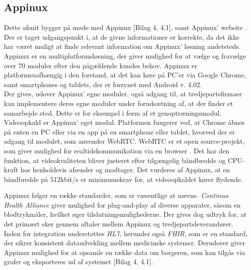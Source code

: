 \subsection{Appinux}
Dette afsnit bygger på møde med Appinux [Bilag 4, 4.1], samt Appinux' website \cite{appinuxwebsite}.\\Der er taget udgangspunkt i, at de givne informationer er korrekte, da det ikke har været muligt at finde relevant information om Appinux' løsning andetsteds.\\
Appinux er en multiplatformsløsning, der giver mulighed for at vælge og fravælge over 70 moduler efter den pågældende kundes behov. Appinux er platformsuafhængig i den forstand, at det kan køre på PC'er via Google Chrome, samt  smartphones og tablets, der er forsynet med Android v. 4.02.\\Der gives, udover Appinux' egne moduler, også adgang til, at tredjepartsfirmaer kan implementere deres egne moduler under forudsætning af, at der finder et samarbejde sted. Dette er for eksempel i form af et genoptræningsmodul.\\Videoopkald er Appinux' eget modul. Platformen fungerer ved, at Chrome åbnes på enten en PC eller via en app på en smartphone eller tablet, hvorved der er adgang til modulet, som anvender WebRTC. WebRTC er et open source-projekt, som giver mulighed for realtidskommunikation via en browser  \cite{webrtchjemmeside}. Det har den funktion, at videokvaliteten bliver justeret efter tilgængelig båndbredde og CPU-kraft hos henholdsvis afsender og modtager. Det vurderes af Appinux, at en båndbredde på 512kbit/s er minimumskrav for, at videoopkaldet kører flydende.

Appinux følger en række standarder, som er væsentlige at nævne. \textit{Continua Health Alliance} giver mulighed for plug-and-play af diverse apparater, såsom en blodtrykmåler, hvilket øger tilslutningsmulighederne. Der gives dog udtryk for, at det primært sker gennem aftaler mellem Appinux og tredjepartsleverandører. Inden for integration understøttes \textit{HL7}, herunder også \textit{FHIR}, som er en standard, der sikrer konsistent dataudvekling mellem medicinske systemer. Derudover giver Appinux mulighed for at opsamle en række data om borgeren, som kan tilgås via grafer og eksporteres ud af systemet [Bilag 4, 4.1].

